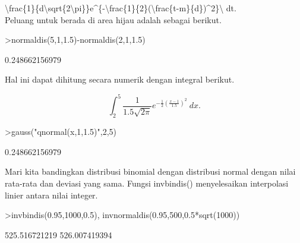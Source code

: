 \documentclass[a4paper,10pt]{article}
\begin{document}
\begin{eulernotebook}
\begin{eulercomment}
\begin{eulercomment}
\begin{eulercomment}
\begin{eulercomment}
\begin{eulercomment}
\begin{eulercomment}
\begin{eulercomment}
\begin{eulercomment}
\begin{eulercomment}
\begin{eulercomment}
\begin{eulercomment}
\begin{eulercomment}
\begin{eulercomment}
\begin{eulercomment}
\begin{eulercomment}
\begin{eulercomment}
\begin{eulercomment}
\begin{eulercomment}
\begin{eulercomment}
\begin{eulercomment}
\begin{eulercomment}
\begin{eulercomment}
\begin{eulercomment}
\begin{eulercomment}
\begin{eulercomment}
\begin{eulercomment}
\begin{eulercomment}
\begin{eulercomment}
\begin{eulercomment}
\begin{eulercomment}
\begin{eulercomment}
\begin{eulercomment}
\begin{eulercomment}
\textbackslash{}frac\{1\}\{d\textbackslash{}sqrt\{2\textbackslash{}pi\}\}e\textasciicircum{}\{-\textbackslash{}frac\{1\}\{2\}(\textbackslash{}frac\{t-m\}\{d\})\textasciicircum{}2\}\textbackslash{} dt.\\
Peluang untuk berada di area hijau adalah sebagai berikut.
\end{eulercomment}
\begin{eulerprompt}
>normaldis(5,1,1.5)-normaldis(2,1,1.5)
\end{eulerprompt}
\begin{euleroutput}
  0.248662156979
\end{euleroutput}
\begin{eulercomment}
Hal ini dapat dihitung secara numerik dengan integral berikut.\\
\end{eulercomment}
\begin{eulerformula}
\[
\int_2^5 \frac{1}{1.5\sqrt{2\pi}}e^{-\frac{1}{2}(\frac{x-1}{1.5})^2}\ dx.
\]
\end{eulerformula}
\begin{eulerprompt}
>gauss("qnormal(x,1,1.5)",2,5)
\end{eulerprompt}
\begin{euleroutput}
  0.248662156979
\end{euleroutput}
\begin{eulercomment}
Mari kita bandingkan distribusi binomial dengan distribusi normal
dengan nilai rata-rata dan deviasi yang sama. Fungsi invbindis()
menyelesaikan interpolasi linier antara nilai integer.
\end{eulercomment}
\begin{eulerprompt}
>invbindis(0.95,1000,0.5), invnormaldis(0.95,500,0.5*sqrt(1000))
\end{eulerprompt}
\begin{euleroutput}
  525.516721219
  526.007419394
\end{euleroutput}

\end{eulercomment}
\end{eulercomment}
\end{eulercomment}
\end{eulercomment}
\end{eulercomment}
\end{eulercomment}
\end{eulercomment}
\end{eulercomment}
\end{eulercomment}
\end{eulercomment}
\end{eulercomment}
\end{eulercomment}
\end{eulercomment}
\end{eulercomment}
\end{eulercomment}
\end{eulercomment}
\end{eulercomment}
\end{eulercomment}
\end{eulercomment}
\end{eulercomment}
\end{eulercomment}
\end{eulercomment}
\end{eulercomment}
\end{eulercomment}
\end{eulercomment}
\end{eulercomment}
\end{eulercomment}
\end{eulercomment}
\end{eulercomment}
\end{eulercomment}
\end{eulercomment}
\end{eulercomment}
\end{eulernotebook}
\end{document}
